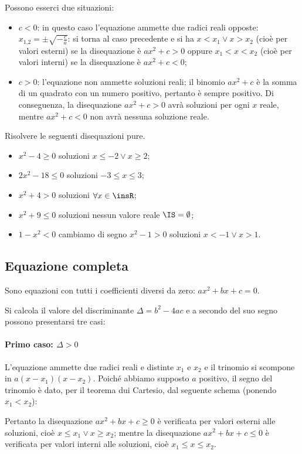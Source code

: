Possono esserci due situazioni:
\begin{itemize}
\item $c<0$: in questo caso l'equazione ammette due radici reali opposte: $x_{1\text{,}2}=\pm \sqrt{-\frac c a}$: si torna al caso precedente e si ha $x<x_1\vee x>x_2$ (cioè per valori esterni) se la disequazione è $ax^2+c>0$ oppure $x_1<x<x_2$ (cioè per valori interni) se la disequazione è $ax^2+c<0$;
\item $c>0$: l'equazione non ammette soluzioni reali; il binomio $ax^2+c$ è la somma di un quadrato con un numero positivo, pertanto è sempre positivo. Di conseguenza, la disequazione $ax^2+c>0$ avrà soluzioni per ogni $x$ reale, mentre $ax^2+c<0$ non avrà nessuna soluzione reale.
\end{itemize}

\begin{exrig}
\begin{esempio}
Risolvere le seguenti disequazioni pure.
\begin{itemize}
\item $x^2-4\ge 0$ soluzioni $x\le -2\vee x\ge 2$;
\item $2x^2-18\le 0$ soluzioni $-3\le x\le 3$;
\item $x^2+4>0$ soluzioni $\forall x\in \insR$;
\item $x^2+9\le 0$ soluzioni nessun valore reale $\IS=\emptyset$;
\item $1-x^2<0$ cambiamo di segno $x^2-1>0$ soluzioni $x<-1\vee x>1$.
\end{itemize}
\end{esempio}
\end{exrig}

\pagebreak

\subsection{Equazione completa}
Sono equazioni con tutti i coefficienti diversi da zero: $ax^2+bx+c=0$.

Si calcola il valore del discriminante $\Delta =b^2-4{ac}$ e a secondo del suo segno possono presentarsi tre casi:

\paragraph{Primo caso: $\Delta >0$}
L'equazione ammette due radici reali e distinte $x_1$ e $x_2$ e il trinomio si scompone in $a(x-x_1)(x-x_2)$. Poiché abbiamo supposto $a$ positivo, il segno del trinomio è dato, per il teorema dui Cartesio, dal seguente schema (ponendo $x_1<x_2$):
\begin{center}

\end{center}
Pertanto la disequazione ${ax}^2+{bx}+c\ge 0$ è verificata per valori esterni alle soluzioni, cioè $x\le x_1\vee x\ge x_2$; mentre la disequazione ${ax}^2+{bx}+c\le 0$ è verificata per valori interni alle soluzioni, cioè $x_1\le x\le x_2$.

